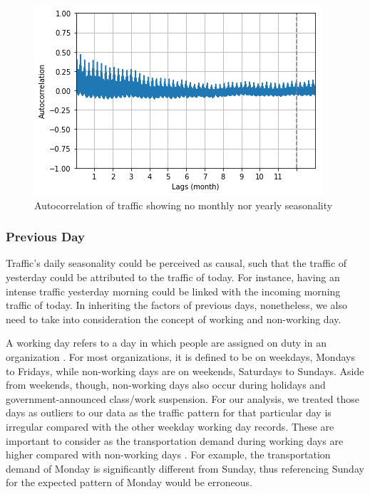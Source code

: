 \begin{figure}
  \includegraphics[width=\linewidth]{figures/figure_autocorr_traffic_month.png}
  \caption{Autocorrelation of traffic showing no monthly nor yearly seasonality}
  \label{figure_autocorr_traffic_month}
\end{figure}


\subsubsection{Previous Day}
Traffic's daily seasonality could be perceived as causal, such that the traffic of yesterday could be attributed to the traffic of today. For instance, having an intense traffic yesterday morning could be linked with the incoming morning traffic of today. In inheriting the factors of previous days, nonetheless, we also need to take into consideration the concept of working and non-working day.

A working day refers to a day in which people are assigned on duty in an organization . For most organizations, it is defined to be on weekdays, Mondays to Fridays, while non-working days are on weekends, Saturdays to Sundays. Aside from weekends, though, non-working days also occur during holidays and government-announced class/work suspension. For our analysis, we treated those days as outliers to our data as the traffic pattern for that particular day is irregular compared with the other weekday working day records. These are important to consider as the transportation demand during working days are higher compared with non-working days . For example, the transportation demand of Monday is significantly different from Sunday, thus referencing Sunday for the expected pattern of Monday would be erroneous.

